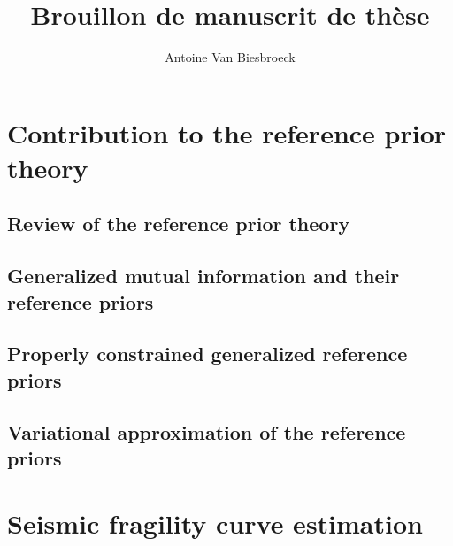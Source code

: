 \documentclass[a4paper]{book}
\title{Brouillon de manuscrit de thèse}
\author{Antoine Van Biesbroeck}
\begin{document}
\maketitle

\dominitoc
\tableofcontents







\part{Contribution to the reference prior theory}\label{part:ref-theory}


\chapter{Review of the reference prior theory}\label{chap:intro-ref}




\chapter{Generalized mutual information and their reference priors}\label{chap:ref-generalized}




\chapter{Properly constrained generalized reference priors}\label{chap:constrained-prior}




\chapter{Variational approximation of the reference priors}\label{chap:varp}




\part{Seismic fragility curve estimation}\label{part:spra}
\end{document}
